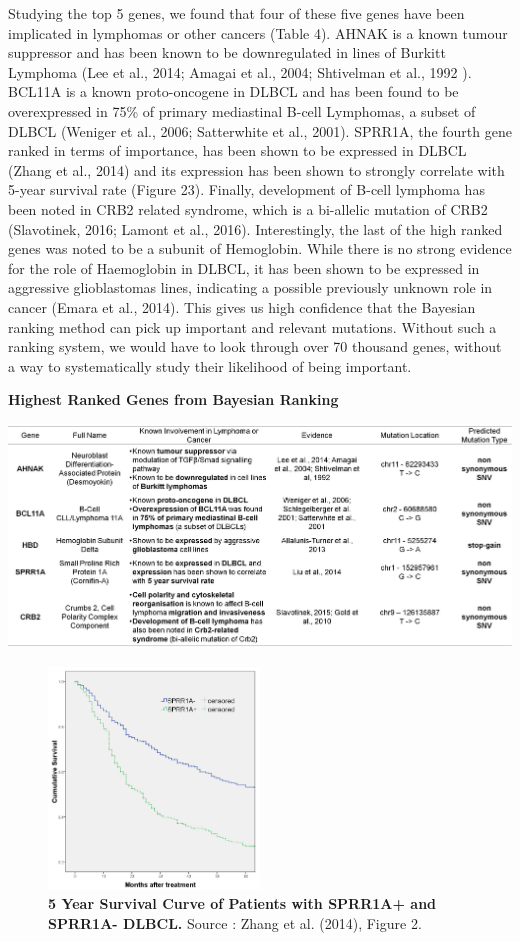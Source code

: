 \documentclass{article}
\begin{document}
Studying the top 5 genes, we found that four of these five genes have been implicated in lymphomas or other cancers (Table 4). AHNAK is a known tumour suppressor and has been known to be downregulated in lines of Burkitt Lymphoma (Lee et al., 2014; Amagai et al., 2004; Shtivelman et al., 1992
). BCL11A is a known proto-oncogene in DLBCL and has been found to be overexpressed in 75\% of primary mediastinal B-cell Lymphomas, a subset of DLBCL (Weniger et al., 2006; Satterwhite et al., 2001). SPRR1A, the fourth gene ranked in terms of importance, has been shown to be expressed in DLBCL (Zhang et al., 2014) and its expression has been shown to strongly correlate with 5-year survival rate (Figure 23). Finally, development of B-cell lymphoma has been noted in CRB2 related syndrome, which is a bi-allelic mutation of CRB2 (Slavotinek, 2016; Lamont et al., 2016). Interestingly, the last of the high ranked genes was noted to be a subunit of Hemoglobin. While there is no strong evidence for the role of Haemoglobin in DLBCL, it has been shown to be expressed in aggressive glioblastomas lines, indicating a possible previously unknown role in cancer (Emara et al., 2014). This gives us high confidence that the Bayesian ranking method can pick up important and relevant mutations. Without such a ranking system, we would have to look through over 70 thousand genes, without a way to systematically study their likelihood of being important. 

\begin{table}[H]
\caption{\textbf{Highest Ranked Genes from Bayesian Ranking}}
\includegraphics[width=\textwidth]{top5importantgenes.png}
\centering
\end{table}

\begin{figure}[H]
\centering
\includegraphics[width=0.5\textwidth]{sprr1adataset.jpg}
\caption{ \textbf{5 Year Survival Curve of Patients with SPRR1A+ and SPRR1A-  DLBCL.} Source : Zhang et al. (2014), Figure 2.}
\end{figure}
\end{document}
